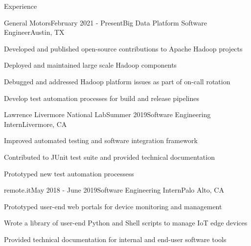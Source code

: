 \documentclass{resume} %
\begin{document}

\begin{rSection}{Experience}
    \begin{rSubsection}{General Motors}{February 2021 - Present}{Big Data Platform Software Engineer}{Austin, TX}
    	\item Developed and published open-source contributions to Apache Hadoop projects 
    	\item Deployed and maintained large scale Hadoop components
        \item Debugged and addressed Hadoop platform issues as part of on-call rotation
        \item Develop test automation processes for build and release pipelines
    \end{rSubsection}

    \begin{rSubsection}{Lawrence Livermore National Lab}{Summer 2019}{Software Engineering Intern}{Livermore, CA}
        \item Improved automated testing and software integration framework
        \item Contributed to JUnit test suite and provided technical documentation
        \item Prototyped new test automation processess 
    \end{rSubsection}

    \begin{rSubsection}{remote.it}{May 2018 - June 2019}{Software Engineering Intern}{Palo Alto, CA}
        \item Prototyped user-end web portals for device monitoring and management
        \item Wrote a library of user-end Python and Shell scripts to manage IoT edge devices
        \item Provided technical documentation for internal and end-user software tools
    \end{rSubsection}

\end{rSection}

\end{document}

